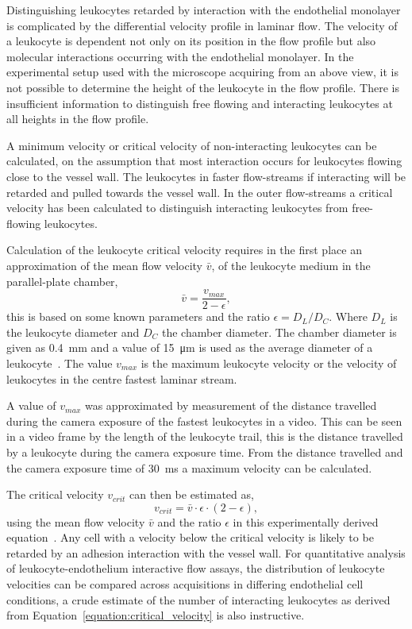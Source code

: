 Distinguishing leukocytes retarded by interaction with the endothelial monolayer is complicated by the differential velocity profile in laminar flow. The velocity of a leukocyte is dependent not only on its position in the flow profile but also molecular interactions occurring with the endothelial monolayer. In the experimental setup used with the microscope acquiring from an above view, it is not possible to determine the height of the leukocyte in the flow profile. There is insufficient information to distinguish free flowing and interacting leukocytes at all heights in the flow profile. 

A minimum velocity or critical velocity of non-interacting leukocytes can be calculated, on the assumption that most interaction occurs for leukocytes flowing close to the vessel wall. The leukocytes in faster flow-streams if interacting will be retarded and pulled towards the vessel wall. In the outer flow-streams a critical velocity has been calculated to distinguish interacting leukocytes from free-flowing leukocytes.

Calculation of the leukocyte critical velocity requires in the first place an approximation of the mean flow velocity $\bar{v}$, of the leukocyte medium in the parallel-plate chamber,
\begin{equation}
	\bar{v}=\frac{v_{max}}{2-\epsilon},
\end{equation}
this is based on some known parameters and the ratio $\epsilon = D_L/D_C$. Where $D_L$ is the leukocyte diameter and $D_C$ the chamber diameter. The chamber diameter is given as \SI{0.4}{\milli\meter} and a value of \SI{15}{\micro\meter} is used as the average diameter of a leukocyte~\cite{Dorgan1998}. The value $v_{max}$ is the maximum leukocyte velocity or the velocity of leukocytes in the centre fastest laminar stream. 

A value of $v_{max}$ was approximated by measurement of the distance travelled during the camera exposure of the fastest leukocytes in a video. This can be seen in a video frame by the length of the leukocyte trail, this is the distance travelled by a leukocyte during the camera exposure time. From the distance travelled and the camera exposure time of \SI{30}{\milli\second} a maximum velocity can be calculated.

The critical velocity $v_{crit}$ can then be estimated as,
\begin{equation}
	v_{crit}=\bar{v}\cdot\epsilon\cdot(2-\epsilon),
\label{equation:critical_velocity}
\end{equation}
using the mean flow velocity $\bar{v}$ and the ratio $\epsilon$ in this experimentally derived equation~\cite{Ley1991}. Any cell with a velocity below the critical velocity is likely to be retarded by an adhesion interaction with the vessel wall. For quantitative analysis of leukocyte-endothelium interactive flow assays, the distribution of leukocyte velocities can be compared across acquisitions in differing endothelial cell conditions, a crude estimate of the number of interacting leukocytes as derived from Equation~\ref{equation:critical_velocity} is also instructive.

